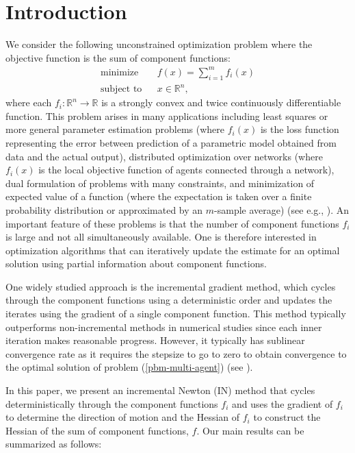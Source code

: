 \documentclass[final,numbook]{svjour3}
\begin{document}
\section{Introduction}
\label{intro}
We consider the following unconstrained optimization problem where the objective function is the sum of component functions:
\begin{eqnarray}\label{pbm-multi-agent}
	\mbox{minimize  }&& f(x) = \sum_{i=1}^m f_i(x)  \\
	\mbox{subject to}&& x \in {\mathbb R}^n, \nonumber
\end{eqnarray}
where each $f_i:{\mathbb R}^n \to {\mathbb R}$ is a strongly convex and twice continuously differentiable function. This problem arises 
in many applications including least squares or more general parameter estimation problems (where $f_i(x)$ is the loss function representing the error between prediction of a parametric model obtained from data and the actual output), distributed optimization over networks (where $f_i(x)$ is the local objective function of agents connected through a network), dual formulation of problems with many constraints, and minimization of expected value of a function (where the expectation is taken over  a finite probability distribution or approximated by an $m$-sample average) (see e.g., \cite{bertsekas2011incremental,RamNedicVeer2007,Jordan13DistLearningApi,Boyd2011AdmmBook,Dickenstein2014,NedicOzdaglar09,Nedic2007rate,BottouLecun2005}). An important feature of these problems is that the number of component functions $f_i$ is large and not all simultaneously available. One is therefore interested in optimization algorithms that can iteratively update the estimate for an optimal solution using partial information about component functions.

One widely studied approach is the incremental gradient method, which cycles through the component functions using a deterministic order and updates the iterates using the gradient of a single component function. This method typically outperforms non-incremental methods in numerical studies since each inner iteration makes reasonable progress. However, it typically has sublinear convergence rate as it requires the stepsize to go to zero to obtain convergence to the optimal solution of problem (\ref{pbm-multi-agent}) (see \cite{bertsekas2011incremental}). 

In this paper, we present an incremental Newton (IN) method that cycles deterministically through the component functions $f_i$ and uses the gradient of $f_i$ to determine the direction of motion and the Hessian of $f_i$ 
to construct the Hessian of the sum of component functions, $f$. Our main results can be summarized as follows:
\end{document}
